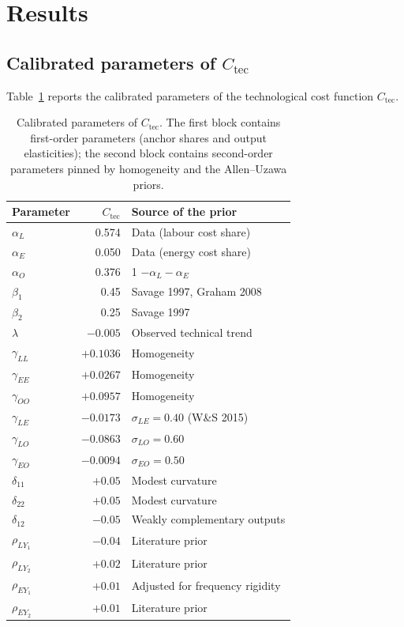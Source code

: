 \documentclass[11pt,a4paper]{article}
\begin{document}
\section{Results}
\label{sec:resultados}

\subsection{Calibrated parameters of $C_{\text{tec}}$}
Table~\ref{tab:params} reports the calibrated parameters of the
technological cost function $C_{\text{tec}}$.

\begin{table}[H]
\centering
\caption{Calibrated parameters of $C_{\text{tec}}$. The first block
contains first-order parameters (anchor shares and output elasticities);
the second block contains second-order parameters pinned by homogeneity
and the Allen--Uzawa priors.}
\label{tab:params}
\small
\begin{tabular}{lrl}
\toprule
Parameter & $C_{\text{tec}}$ & Source of the prior \\
\midrule
$\alpha_L$  & 0.574 & Data (labour cost share) \\
$\alpha_E$  & 0.050 & Data (energy cost share) \\
$\alpha_O$  & 0.376 & 1 $-\alpha_L-\alpha_E$ \\
$\beta_1$   & 0.45  & Savage 1997, Graham 2008 \\
$\beta_2$   & 0.25  & Savage 1997 \\
$\lambda$   & $-0.005$ & Observed technical trend \\
\midrule
$\gamma_{LL}$ & $+0.1036$ & Homogeneity \\
$\gamma_{EE}$ & $+0.0267$ & Homogeneity \\
$\gamma_{OO}$ & $+0.0957$ & Homogeneity \\
$\gamma_{LE}$ & $-0.0173$ & $\sigma_{LE}=0.40$ (W\&S 2015) \\
$\gamma_{LO}$ & $-0.0863$ & $\sigma_{LO}=0.60$ \\
$\gamma_{EO}$ & $-0.0094$ & $\sigma_{EO}=0.50$ \\
$\delta_{11}$ & $+0.05$ & Modest curvature \\
$\delta_{22}$ & $+0.05$ & Modest curvature \\
$\delta_{12}$ & $-0.05$ & Weakly complementary outputs \\
$\rho_{LY_1}$ & $-0.04$ & Literature prior \\
$\rho_{LY_2}$ & $+0.02$ & Literature prior \\
$\rho_{EY_1}$ & $+0.01$ & Adjusted for frequency rigidity \\
$\rho_{EY_2}$ & $+0.01$ & Literature prior \\
\bottomrule
\end{tabular}
\end{table}
\end{document}
